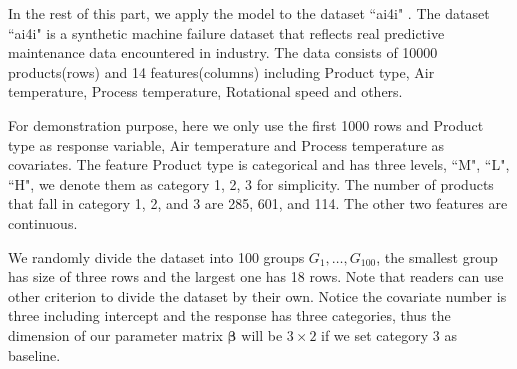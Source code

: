 \documentclass[12pt]{article}
\begin{document}
In the rest of this part, we apply the model to the dataset ``ai4i" \cite{Dua:2019}. The dataset ``ai4i" is a synthetic machine failure dataset that reflects real predictive maintenance data encountered in industry. The data consists of 10000 products(rows) and 14 features(columns) including Product type, Air temperature, Process temperature, Rotational speed and others.

For demonstration purpose, here we only use the first 1000 rows and Product type as response variable, Air temperature and Process temperature as covariates. The feature Product type is categorical and has three levels, ``M", ``L", ``H", we denote them as category 1, 2, 3 for simplicity. The number of products that fall in category 1, 2, and 3 are 285, 601, and 114. The other two features are continuous.


We randomly divide the dataset into 100 groups $G_1,\dots,G_{100}$, the smallest group has size of three rows and the largest one has 18 rows. Note that readers can use other criterion to divide the dataset by their own. Notice the covariate number is three including intercept and the response has three categories, thus the dimension of our parameter matrix $\boldsymbol{\beta}$ will be $3 \times 2$ if we set category 3 as baseline.
\end{document}
